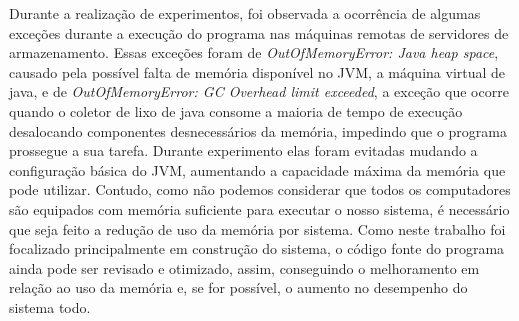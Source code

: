 Durante a realização de experimentos, foi observada a ocorrência de algumas exceções durante a execução do programa nas máquinas remotas de servidores de armazenamento. Essas exceções foram de \textit{OutOfMemoryError: Java heap space}, causado pela possível falta de memória disponível no JVM, a máquina virtual de java, e de \textit{OutOfMemoryError: GC Overhead limit exceeded}, a exceção que ocorre quando o coletor de lixo de java consome a maioria de tempo de execução desalocando componentes desnecessários da memória, impedindo que o programa prossegue a sua tarefa.
Durante experimento elas foram evitadas mudando a configuração básica do JVM, aumentando a capacidade máxima da memória que pode utilizar. Contudo, como não podemos considerar que todos os computadores são equipados com memória suficiente para executar o nosso sistema, é necessário que seja feito a redução de uso da memória por sistema. 
Como neste trabalho foi focalizado principalmente em construção do sistema, o código fonte do programa ainda pode ser revisado e otimizado, assim, conseguindo o melhoramento em relação ao uso da memória e, se for possível, o aumento no desempenho do sistema todo.
\\


